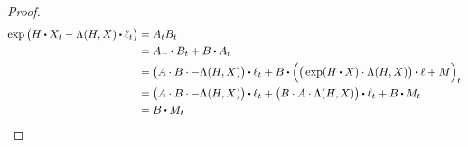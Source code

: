 \begin{proof}
  \begin{align*}
    \exp\big( H \shortInt \X_t - \ode(H, \X) \shortInt \leb_t \big) 
    &= A_t B_t \\
    &= A_- \shortInt B_t + B \shortInt A_t \\
    &= \big( A \cdot B \cdot -\ode(H, \X) \big) \shortInt \leb_t + B \shortInt \Big( \big( \exp( H \shortInt \X ) \cdot \ode(H, \X) \big) \shortInt \leb + M \Big)_t \\
    &= \big( A \cdot B \cdot -\ode(H, \X) \big) \shortInt \leb_t + \big( B \cdot A \cdot \ode(H, \X) \big) \shortInt \leb_t + B \shortInt M_t \\
    &= B \shortInt M_t
  \end{align*}
\end{proof}
